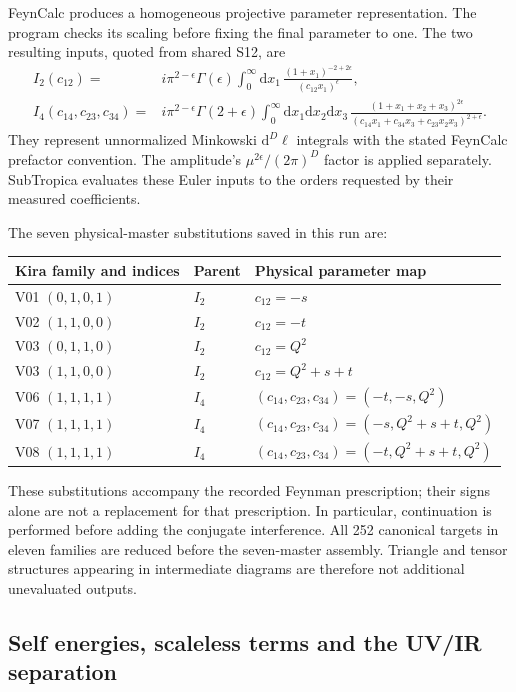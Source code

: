 \documentclass[11pt,a4paper]{article}
\newcommand{\dd}{\mathrm{d}}
\newcommand{\eps}{\epsilon}
\begin{document}
FeynCalc produces a homogeneous projective parameter representation.
The program checks its scaling before fixing the final parameter to one.
The two resulting inputs, quoted from shared S12, are
\begin{align}
 I_2(c_{12})={}&i\pi^{2-\eps}\Gamma(\eps)
 \int_0^\infty\dd x_1\,
 \frac{(1+x_1)^{-2+2\eps}}{(c_{12}x_1)^\eps},
 \label{eq:bubbleinput}\\
 I_4(c_{14},c_{23},c_{34})={}&i\pi^{2-\eps}\Gamma(2+\eps)
 \int_0^\infty\dd x_1\dd x_2\dd x_3\,
 \frac{(1+x_1+x_2+x_3)^{2\eps}}
 {(c_{14}x_1+c_{34}x_3+c_{23}x_2x_3)^{2+\eps}}.
 \label{eq:boxinput}
\end{align}
They represent unnormalized Minkowski $\dd^D\ell$ integrals with the
stated FeynCalc prefactor convention. The amplitude's
$\mu^{2\eps}/(2\pi)^D$ factor is applied separately. SubTropica
evaluates these Euler inputs to the orders requested by their measured
coefficients.

The seven physical-master substitutions saved in this run are:
\begin{center}
\small
\begin{tabular}{@{}lll@{}}
\toprule
Kira family and indices & Parent & Physical parameter map\\
\midrule
V01 $(0,1,0,1)$ & $I_2$ & $c_{12}=-s$\\
V02 $(1,1,0,0)$ & $I_2$ & $c_{12}=-t$\\
V03 $(0,1,1,0)$ & $I_2$ & $c_{12}=Q^2$\\
V03 $(1,1,0,0)$ & $I_2$ & $c_{12}=Q^2+s+t$\\
V06 $(1,1,1,1)$ & $I_4$ & $(c_{14},c_{23},c_{34})=(-t,-s,Q^2)$\\
V07 $(1,1,1,1)$ & $I_4$ & $(c_{14},c_{23},c_{34})=(-s,Q^2+s+t,Q^2)$\\
V08 $(1,1,1,1)$ & $I_4$ & $(c_{14},c_{23},c_{34})=(-t,Q^2+s+t,Q^2)$\\
\bottomrule
\end{tabular}
\end{center}
These substitutions accompany the recorded Feynman prescription; their
signs alone are not a replacement for that prescription. In particular,
continuation is performed before adding the conjugate interference.
All 252 canonical targets in eleven families are reduced before the
seven-master assembly. Triangle and tensor structures appearing in
intermediate diagrams are therefore not additional unevaluated outputs.

\subsection{Self energies, scaleless terms and the UV/IR separation}
\end{document}
